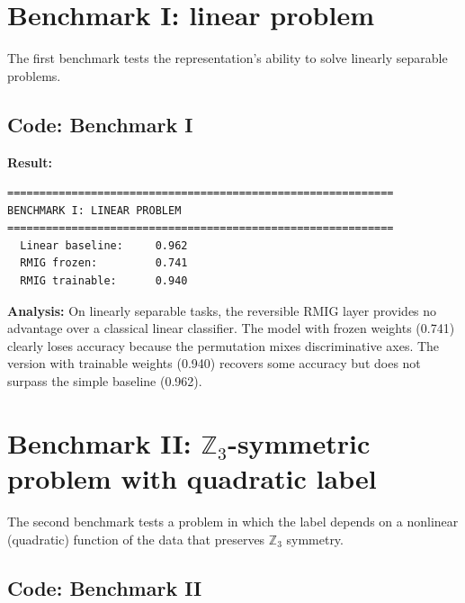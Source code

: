 \documentclass[11pt,a4paper]{report}
\begin{document}

\section{Benchmark I: linear problem}

The first benchmark tests the representation's ability to solve linearly separable problems.

\subsection{Code: Benchmark I}

\noindent{}


\textbf{Result:}
\begin{verbatim}
============================================================
BENCHMARK I: LINEAR PROBLEM
============================================================
  Linear baseline:     0.962
  RMIG frozen:         0.741
  RMIG trainable:      0.940
\end{verbatim}

\textbf{Analysis:} On linearly separable tasks, the reversible RMIG layer provides no advantage over a classical linear classifier. The model with frozen weights (0.741) clearly loses accuracy because the permutation mixes discriminative axes. The version with trainable weights (0.940) recovers some accuracy but does not surpass the simple baseline (0.962).


\section{Benchmark II: $\mathbb{Z}_3$-symmetric problem with quadratic label}

The second benchmark tests a problem in which the label depends on a nonlinear (quadratic) function of the data that preserves $\mathbb{Z}_3$ symmetry.

\subsection{Code: Benchmark II}
\end{document}
